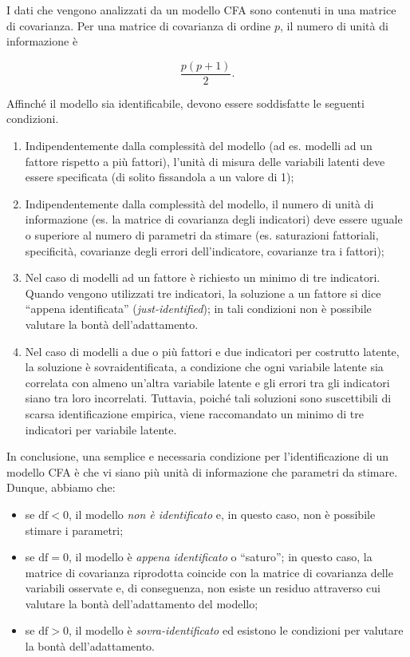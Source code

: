 \documentclass[
  11pt,
]{krantz}
\providecommand{\tightlist}{%
  \setlength{\itemsep}{0pt}\setlength{\parskip}{0pt}}
\theoremstyle{definition}
\theoremstyle{definition}
\theoremstyle{definition}
\theoremstyle{definition}
\theoremstyle{remark}
\begin{document}
I dati che vengono analizzati da un modello CFA sono contenuti in una matrice di covarianza. Per una matrice di covarianza di ordine \(p\), il numero di unità di informazione è

\[
\frac{p (p+1)}{2}.
\]

Affinché il modello sia identificabile, devono essere soddisfatte le seguenti condizioni.

\begin{enumerate}
\def\labelenumi{\arabic{enumi}.}
\tightlist
\item
  Indipendentemente dalla complessità del modello (ad es. modelli ad un fattore rispetto a più fattori), l'unità di misura delle variabili latenti deve essere specificata (di solito fissandola a un valore di 1);
\item
  Indipendentemente dalla complessità del modello, il numero di unità di informazione (es. la matrice di covarianza degli indicatori) deve essere uguale o superiore al numero di parametri da stimare (es. saturazioni fattoriali, specificità, covarianze degli errori dell'indicatore, covarianze tra i fattori);
\item
  Nel caso di modelli ad un fattore è richiesto un minimo di tre indicatori. Quando vengono utilizzati tre indicatori, la soluzione a un fattore si dice ``appena identificata'' (\emph{just-identified}); in tali condizioni non è possibile valutare la bontà dell'adattamento.
\item
  Nel caso di modelli a due o più fattori e due indicatori per costrutto latente, la soluzione è sovraidentificata, a condizione che ogni variabile latente sia correlata con almeno un'altra variabile latente e gli errori tra gli indicatori siano tra loro incorrelati. Tuttavia, poiché tali soluzioni sono suscettibili di scarsa identificazione empirica, viene raccomandato un minimo di tre indicatori per variabile latente.
\end{enumerate}

In conclusione, una semplice e necessaria condizione per l'identificazione di un modello CFA è che vi siano più unità di informazione che parametri da stimare. Dunque, abbiamo che:

\begin{itemize}
\tightlist
\item
  se \(\mbox{df} < 0\), il modello \emph{non è identificato} e, in questo caso, non è possibile stimare i parametri;
\item
  se \(\mbox{df} = 0\), il modello è \emph{appena identificato} o ``saturo''; in questo caso, la matrice di covarianza riprodotta coincide con la matrice di covarianza delle variabili osservate e, di conseguenza, non esiste un residuo attraverso cui valutare la bontà dell'adattamento del modello;
\item
  se \(\mbox{df} > 0\), il modello è \emph{sovra-identificato} ed esistono le condizioni per valutare la bontà dell'adattamento.
\end{itemize}
\end{document}
